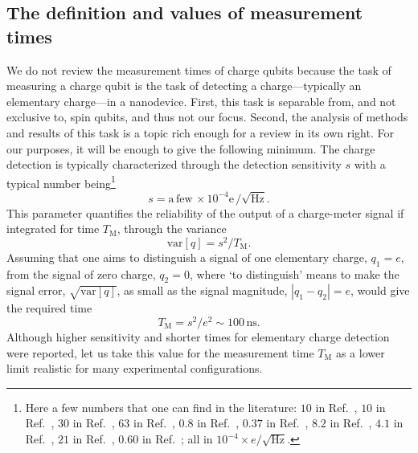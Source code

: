 \documentclass[aps, prx, showpacs, twocolumn, superscriptaddress, notitlepage, longbibliography, floatfix, nofootinbib]{revtex4-2}
\begin{document}
\subsection{The definition and values of measurement times}

We do not review the measurement times of charge qubits because the task of measuring a charge qubit is the task of detecting a charge---typically an elementary charge---in a nanodevice. First, this task is separable from, and not exclusive to, spin qubits, and thus not our focus. Second, the analysis of methods and results of this task is a topic rich enough for a review in its own right. For our purposes, it will be enough to give the following minimum. The charge detection is typically characterized through the detection sensitivity $s$ with a typical number being\footnote
{
Here a few numbers that one can find in the literature: 
$10$ in Ref.~\cite{reilly_fast_2007},
$10$ in Ref.~\cite{wang_graphene_2010},
$30$ in Ref.~\cite{fringes_charge_2011}, 
$63$ in Ref.~\cite{colless_dispersive_2013},
$0.8$ in Ref.~\cite{stehlik_fast_2015},
$0.37$ in Ref.~\cite{gonzalez-zalba_probing_2015},
$8.2$ in Ref.~\cite{zajac_scalable_2016},
$4.1$ in Ref.~\cite{zheng_rapid_2019},
$21$ in Ref.~\cite{chanrion_charge_2020},
$0.60$ in Ref.~\cite{schupp_sensitive_2020};
all in $10^{-4} \times e/\surd{\mathrm{Hz}}$.
} 
\begin{equation}
s = \mathrm{a\,few}\, \times 10^{-4}\mathrm{e}\, / \sqrt{\mathrm{Hz}}.  
\label{eq:chargeSensitivity}
\end{equation}
This parameter quantifies the reliability of the output of a charge-meter signal if integrated for time $T_\mathrm{M}$, through the variance
\begin{equation}
\textrm{var}[q] = s^2 / T_\mathrm{M}.
\end{equation}
Assuming that one aims to distinguish a signal of one elementary charge, $q_1=e$, from the signal of zero charge, $q_2=0$, where `to distinguish' means to make the signal error, $\sqrt{\textrm{var}[q]}$, as small as the signal magnitude, $|q_1-q_2|=e$, would give the required time
\begin{equation}
T_\mathrm{M} = s^2 / e^2 \sim 100\, \mathrm{ns}.
\label{eq:detectionLimit}
\end{equation}
Although higher sensitivity\cite{schaal_fast_2020} and shorter times\cite{keith_single-shot_2019} for elementary charge detection were reported, let us take this value for the measurement time $T_\mathrm{M}$ as a lower limit 
realistic  for many experimental configurations. 
\end{document}
